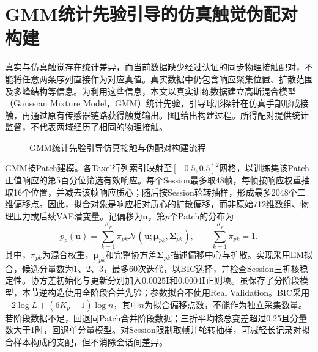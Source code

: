 \section{GMM统计先验引导的仿真触觉伪配对构建}
\label{sec:ch05_gmm_pseudopairs}

真实与仿真触觉存在统计差异，而当前数据缺少经过认证的同步物理接触配对，不能将任意两条序列直接作为对应真值。真实数据中仍包含响应聚集位置、扩散范围及多峰结构等信息。为利用这些信息，本文以真实训练数据建立高斯混合模型（Gaussian Mixture Model，GMM）统计先验，引导球形探针在仿真手部形成接触，再通过原有传感器链路获得触觉输出。图\ref{fig:ch05_gmm_physical_pipeline}给出构建过程。所得配对提供统计监督，不代表两域经历了相同的物理接触。

\begin{figure}[htbp]
 \centering
 \caption{GMM统计先验引导仿真接触与伪配对构建流程}
 \label{fig:ch05_gmm_physical_pipeline}
\end{figure}

GMM按Patch建模。各Taxel行列索引映射至$[-0.5,0.5]^2$网格，以训练集该Patch正值响应的第5百分位筛选有效响应。每个Session最多取48帧，每帧按响应权重抽取16个位置，并减去该帧响应质心；随后按Session轮转抽样，形成最多2048个二维偏移点。因此，拟合对象是响应相对质心的扩散偏移，而非原始712维数组、物理压力或后续VAE潜变量。记偏移为$\boldsymbol u$，第$p$个Patch的分布为
\begin{equation}
 p_p(\boldsymbol u)=\sum_{k=1}^{K_p}\pi_{pk}
 \mathcal N(\boldsymbol u;\boldsymbol\mu_{pk},\boldsymbol\Sigma_{pk}),
 \qquad \sum_{k=1}^{K_p}\pi_{pk}=1.
 \label{eq:ch05_gmm_prior}
\end{equation}
其中，$\pi_{pk}$为混合权重，$\boldsymbol\mu_{pk}$和完整协方差$\boldsymbol\Sigma_{pk}$描述偏移中心与扩散。实现采用EM拟合，候选分量数为1、2、3，最多60次迭代，以BIC选择，并检查Session三折核稳定性。协方差初始化与更新分别加入$0.0025\boldsymbol I$和$0.0004\boldsymbol I$正则项。虽保存了分阶段模型，本节逆构造使用全阶段合并先验；参数拟合不使用Real Validation。BIC采用$-2\log L+(6K_p-1)\log n$，其中$n$为拟合偏移点数，不能作为独立采集数量。若阶段数据不足，回退同Patch合并阶段数据；三折平均核总变差超过0.25且分量数大于1时，回退单分量模型。对Session限制取帧并轮转抽样，可减轻长记录对拟合样本构成的支配，但不消除会话间差异。

